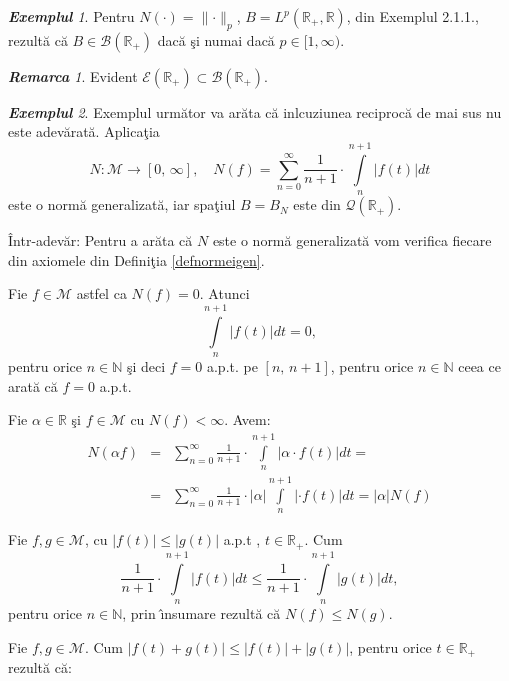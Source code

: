 \documentclass[ a4paper, 12pt]{report}
\theoremstyle{definition}
\theoremstyle{remark}
\newtheorem{remarc}{\bf Remarca}[section]
\newtheorem{exemple}{\bf Exemplul}[section]
\numberwithin{equation}{section}
\begin{document}
\begin{exemple}
Pentru $N(\cdot) = \lVert \cdot \rVert_p$, $B = L^p(\mathbb{R}_+ , \mathbb{R})$, din Exemplul 2.1.1., rezult\u a c\u a $B \in \mathcal{B}(\mathbb{R}_+)$ dac\u a \c si numai dac\u a $p \in [1, \infty)$.
\end{exemple}
\begin{remarc} Evident $\mathcal{E}(\mathbb{R}_+) \subset \mathcal{B}(\mathbb{R}_+)$.
\end{remarc}
\begin{exemple} Exemplul urm\u ator va ar\u ata c\u a inlcuziunea reciproc\u a de mai sus nu este adev\u arat\u a. Aplica\c tia
\[ N : \mathcal{M} \to [0, \, \infty], \quad
N(f) = \sum\limits_{n=0}^{\infty} {\frac{1}{n+1} \cdot \int\limits_{n}^{n+1}{\lvert f(t) \rvert dt}}\]
este o norm\u a generalizat\u a, iar spa\c tiul $B = B_N$ este din $\mathcal{Q}(\mathbb{R}_+)$.
\end{exemple}
\^ Intr-adev\u ar: Pentru a ar\u ata c\u a $N$ este o norm\u a  generalizat\u a vom verifica fiecare din axiomele din Defini\c tia \ref{defnormeigen}.

Fie $f \in \mathcal{M}$ astfel ca $N(f) = 0$. Atunci
$$\int\limits_{n}^{n+1}\lvert f(t) \rvert dt = 0,$$ pentru orice $n \in \mathbb{N}$ \c si deci $f = 0$ a.p.t. pe $[n,\, n+1]$, pentru orice $n \in \mathbb{N}$ ceea ce arat\u a c\u a $f = 0$ a.p.t.

\smallskip

Fie $\alpha \in \mathbb{R}$ \c si $f \in \mathcal{M}$ cu $N(f) < \infty$. Avem:
\begin{eqnarray*}
N(\alpha f)&=&\sum\limits_{n=0}^{\infty}{\frac{1}{n+1} \cdot \int\limits_{n}^{n+1}{\lvert \alpha \cdot f(t) \rvert} dt} = \\
&=&\sum\limits_{n=0}^{\infty}{\frac{1}{n+1} \cdot |\alpha| \int\limits_{n}^{n+1}{\lvert \cdot f(t) \rvert} dt} = |\alpha| N(f)
\end{eqnarray*}

\smallskip
Fie $f, g \in \mathcal{M}$, cu $\lvert f(t) \rvert\leq \lvert g(t) \rvert $ a.p.t , $ t \in \mathbb{R}_+$. Cum
 $$\frac{1}{n+1} \cdot \int\limits_{n}^{n+1}{\lvert f(t) \rvert dt} \leq \frac{1}{n+1} \cdot \int\limits_{n}^{n+1}{\lvert g(t) \rvert dt},$$
 pentru orice $n \in \mathbb{N}$, prin \^\i nsumare rezult\u a c\u a $N(f) \leq N(g)$.

\smallskip

Fie $f, g \in \mathcal{M}$. Cum $\lvert f(t) + g(t)\rvert \leq \lvert f(t)\rvert + \lvert g(t)\rvert$, pentru orice $t \in \mathbb{R}_+$ rezult\u a c\u a:
\end{document}
